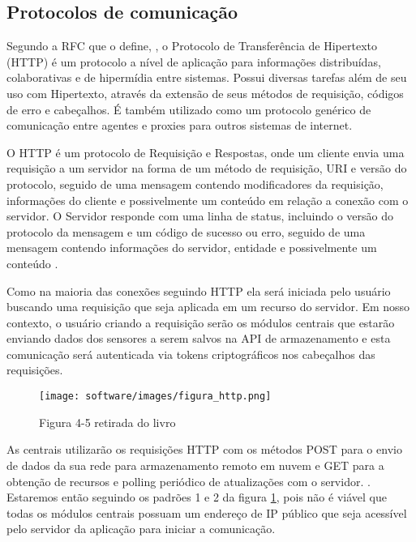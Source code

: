     \subsection{Protocolos de comunicação}
    
    Segundo a RFC que o define, \cite{rfc}, o Protocolo de Transferência de Hipertexto (HTTP) é um protocolo a nível de aplicação para informações distribuídas, colaborativas e de hipermídia entre sistemas. Possui diversas tarefas além de seu uso com Hipertexto, através da extensão de seus métodos de requisição, códigos de erro e cabeçalhos. É também utilizado como um protocolo genérico de comunicação entre agentes e proxies para outros sistemas de internet. 

    O HTTP é um protocolo de Requisição e Respostas, onde um cliente envia uma requisição a um servidor na forma de um método de requisição, URI e versão do protocolo, seguido de uma mensagem contendo modificadores da requisição, informações do cliente e possivelmente um conteúdo em relação a conexão com o servidor. O Servidor responde com uma linha de status, incluindo o versão do protocolo da mensagem e um código de sucesso ou erro, seguido de uma mensagem contendo informações do servidor, entidade e possivelmente um conteúdo \cite{rfc}.

    Como na maioria das conexões seguindo HTTP ela será iniciada pelo usuário buscando uma requisição que seja aplicada em um recurso do servidor. Em nosso contexto, o usuário criando a requisição serão os módulos centrais que estarão enviando dados dos sensores a serem salvos na API de armazenamento e esta comunicação será autenticada via tokens criptográficos nos cabeçalhos das requisições.

    \begin{figure}[H]
        \texttt{[image: software/images/figura\_http.png]}
        \caption{Figura 4-5 retirada do livro \cite{pfister_2011}}
        \label{fig:http}
    \end{figure}

    As centrais utilizarão os requisições HTTP com os métodos POST para o envio de dados da sua rede para armazenamento remoto em nuvem e GET para a obtenção de recursos e polling periódico de atualizações com o servidor. \cite{pfister_2011}. Estaremos então seguindo os padrões 1 e 2 da figura \ref{fig:http}, pois não é viável que todas os módulos centrais possuam um endereço de IP público que seja acessível pelo servidor da aplicação para iniciar a comunicação.
    
